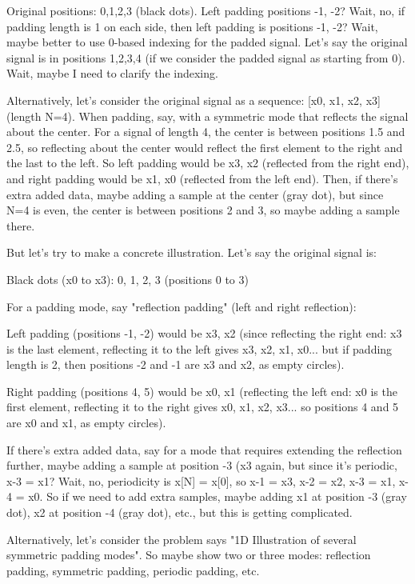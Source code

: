 Original positions: 0,1,2,3 (black dots). Left padding positions -1, -2? Wait, no, if padding length is 1 on each side, then left padding is positions -1, -2? Wait, maybe better to use 0-based indexing for the padded signal. Let's say the original signal is in positions 1,2,3,4 (if we consider the padded signal as starting from 0). Wait, maybe I need to clarify the indexing.

Alternatively, let's consider the original signal as a sequence: [x0, x1, x2, x3] (length N=4). When padding, say, with a symmetric mode that reflects the signal about the center. For a signal of length 4, the center is between positions 1.5 and 2.5, so reflecting about the center would reflect the first element to the right and the last to the left. So left padding would be x3, x2 (reflected from the right end), and right padding would be x1, x0 (reflected from the left end). Then, if there's extra added data, maybe adding a sample at the center (gray dot), but since N=4 is even, the center is between positions 2 and 3, so maybe adding a sample there.

But let's try to make a concrete illustration. Let's say the original signal is:

Black dots (x0 to x3): 0, 1, 2, 3 (positions 0 to 3)

For a padding mode, say "reflection padding" (left and right reflection):

Left padding (positions -1, -2) would be x3, x2 (since reflecting the right end: x3 is the last element, reflecting it to the left gives x3, x2, x1, x0... but if padding length is 2, then positions -2 and -1 are x3 and x2, as empty circles).

Right padding (positions 4, 5) would be x0, x1 (reflecting the left end: x0 is the first element, reflecting it to the right gives x0, x1, x2, x3... so positions 4 and 5 are x0 and x1, as empty circles).

If there's extra added data, say for a mode that requires extending the reflection further, maybe adding a sample at position -3 (x3 again, but since it's periodic, x-3 = x1? Wait, no, periodicity is x[N] = x[0], so x-1 = x3, x-2 = x2, x-3 = x1, x-4 = x0. So if we need to add extra samples, maybe adding x1 at position -3 (gray dot), x2 at position -4 (gray dot), etc., but this is getting complicated.

Alternatively, let's consider the problem says "1D Illustration of several symmetric padding modes". So maybe show two or three modes: reflection padding, symmetric padding, periodic padding, etc.

